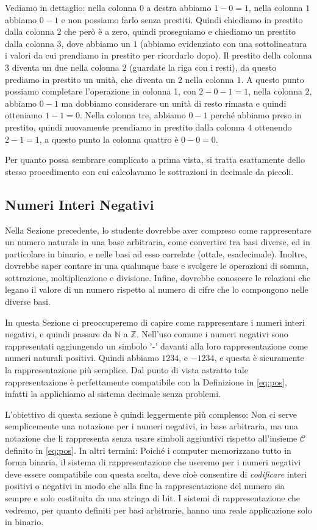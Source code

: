 Vediamo in dettaglio: nella colonna $0$ a destra abbiamo $1-0 = 1$,
nella colonna $1$ abbiamo $0-1$ e non possiamo farlo senza prestiti. 
Quindi chiediamo in prestito dalla colonna $2$ che però è a zero, quindi proseguiamo e chiediamo un prestito dalla colonna $3$, dove abbiamo un $1$ (abbiamo evidenziato con una sottolineatura i valori da cui prendiamo in prestito per ricordarlo dopo).
Il prestito della colonna $3$ diventa un due nella colonna $2$ (guardate la riga con i resti), da questo prediamo in prestito un unità, che diventa un $2$ nella colonna $1$.
A questo punto possiamo completare l'operazione in colonna 1, con $2-0-1 = 1$,
nella colonna $2$, abbiamo $0 - 1$ ma dobbiamo considerare un unità di resto rimasta e quindi otteniamo $1 - 1 = 0$. Nella colonna tre, abbiamo $0-1$ perché abbiamo preso in prestito, quindi nuovamente prendiamo in prestito dalla colonna $4$ ottenendo $2-1 = 1$, a questo punto la colonna quattro è $0-0=0$.

Per quanto possa sembrare complicato a prima vista, si tratta esattamente
dello stesso procedimento con cui calcolavamo le sottrazioni in decimale da piccoli.


\subsection{Numeri Interi Negativi}

Nella Sezione precedente, lo studente dovrebbe aver compreso come rappresentare
un numero naturale in una base arbitraria, come convertire tra basi diverse, ed
in particolare in binario, e nelle basi ad esso correlate (ottale,
esadecimale). Inoltre, dovrebbe saper contare in una qualunque base e svolgere
le operazioni di somma, sottrazione, moltiplicazione e divisione. Infine,
dovrebbe conoscere le relazioni che legano il valore di un numero rispetto al
numero di cifre che lo compongono nelle diverse basi.

In questa Sezione ci preoccuperemo di capire come rappresentare i numeri interi negativi, e quindi passare da $\mathbb{N}$ a $\mathbb{Z}$. Nell'uso comune i numeri negativi sono rappresentati aggiungendo un simbolo '-' davanti alla loro rappresentazione come numeri naturali positivi. Quindi abbiamo $1234$, e $-1234$, e questa è sicuramente la rappresentazione più semplice. Dal punto di vista astratto tale rappresentazione è perfettamente compatibile con la Definizione in \eqref{eq:pos}, infatti la applichiamo al sistema decimale senza problemi.

L'obiettivo di questa sezione è quindi leggermente più complesso: Non ci serve semplicemente una notazione per i numeri negativi, in base arbitraria, ma una notazione che li rappresenta senza usare simboli aggiuntivi rispetto all'insieme $\mathcal{C}$ definito in \eqref{eq:pos}. In altri termini: Poiché i computer memorizzano tutto in forma binaria, il sistema di rappresentazione che useremo per i numeri negativi deve essere compatibile con questa scelta, deve cioè consentire di \emph{codificare} interi positivi o negativi in modo che alla fine la rappresentazione del numero sia sempre e solo costituita da una stringa di bit. I sistemi di rappresentazione che vedremo, per quanto
definiti per basi arbitrarie, hanno una reale applicazione solo in binario.

